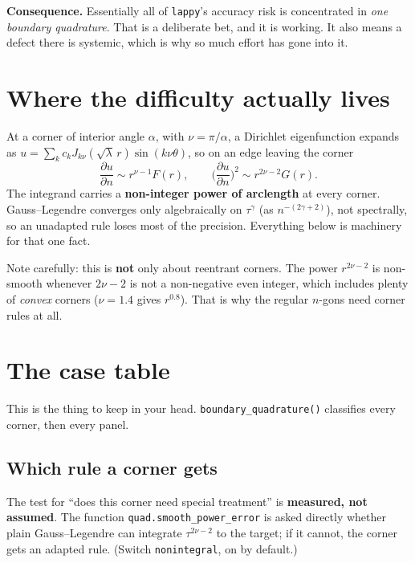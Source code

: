 \documentclass[11pt]{article}
\newcommand{\code}[1]{\texttt{#1}}
\newcommand{\pdn}[1]{\frac{\partial #1}{\partial n}}
\begin{document}
\medskip\noindent
\textbf{Consequence.} Essentially all of \code{lappy}'s accuracy risk is
concentrated in \emph{one boundary quadrature}. That is a deliberate bet, and it
is working. It also means a defect there is systemic, which is why so much
effort has gone into it.

\section{Where the difficulty actually lives}

At a corner of interior angle $\alpha$, with $\nu = \pi/\alpha$, a Dirichlet
eigenfunction expands as
$u = \sum_k c_k J_{k\nu}(\sqrt{\lambda}\,r)\sin(k\nu\theta)$, so on an edge
leaving the corner
\[
  \pdn{u} \sim r^{\nu-1} F(r),
  \qquad
  \Big(\pdn{u}\Big)^{\!2} \sim r^{2\nu-2} G(r).
\]
The integrand carries a \textbf{non-integer power of arclength} at every corner.
Gauss--Legendre converges only algebraically on $\tau^\gamma$ (as
$n^{-(2\gamma+2)}$), not spectrally, so an unadapted rule loses most of the
precision. Everything below is machinery for that one fact.

Note carefully: this is \textbf{not} only about reentrant corners. The power
$r^{2\nu-2}$ is non-smooth whenever $2\nu-2$ is not a non-negative even integer,
which includes plenty of \emph{convex} corners ($\nu = 1.4$ gives $r^{0.8}$).
That is why the regular $n$-gons need corner rules at all.

\section{The case table}

This is the thing to keep in your head. \code{boundary\_quadrature()} classifies
every corner, then every panel.

\subsection{Which rule a corner gets}

The test for ``does this corner need special treatment'' is \textbf{measured,
not assumed}. The function \code{quad.smooth\_power\_error} is asked directly
whether plain Gauss--Legendre can integrate $\tau^{2\nu-2}$ to the target; if it
cannot, the corner gets an adapted rule. (Switch \code{nonintegral}, on by
default.)
\end{document}
